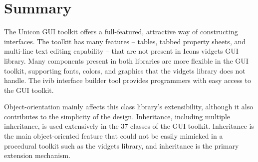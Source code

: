 \section*{Summary}

The Unicon GUI toolkit offers a full-featured, attractive way of
constructing interfaces. The toolkit has many features --
tables, tabbed property sheets, and multi-line text editing capability
-- that are not present in Icon{\textquotesingle}s vidgets GUI
library. Many components present in both libraries are more
flexible in the GUI toolkit, supporting fonts, colors, and graphics
that the vidgets library does not handle. The ivib interface
builder tool provides programmers with easy access to the GUI toolkit.

Object-orientation mainly affects this class library's
extensibility, although it also contributes to the
simplicity of the design. Inheritance, including multiple inheritance,
is used extensively in the 37 classes of the GUI toolkit. Inheritance
is the main object-oriented feature that could not be easily mimicked
in a procedural toolkit such as the vidgets library, and inheritance is
the primary extension mechanism.

\bigskip

